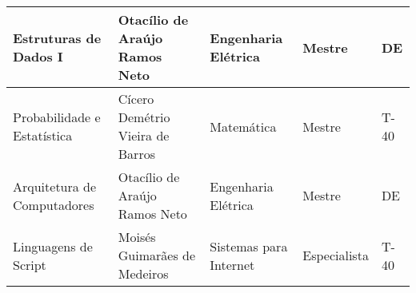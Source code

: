 \begin{table}[h!]
\begin{tabular}{lllll}
\multicolumn{1}{|l|}{\cellcolor[HTML]{FFFFFF}Estruturas de Dados I}                         & \multicolumn{1}{l|}{Otac\'ilio de Ara\'ujo Ramos Neto}   & \multicolumn{1}{l|}{Engenharia El\'etrica}             & \multicolumn{1}{l|}{Mestre}             & \multicolumn{1}{l|}{DE}                        \\ \hline
\multicolumn{1}{|l|}{Probabilidade e Estat\'istica}                                             & \multicolumn{1}{l|}{Cícero Demétrio Vieira de Barros}                 & \multicolumn{1}{l|}{Matem\'atica}  & \multicolumn{1}{l|}{Mestre}             & \multicolumn{1}{l|}{T-40}                          \\ \hline
\multicolumn{1}{|l|}{Arquitetura de Computadores}                                                      & \multicolumn{1}{l|}{Otac\'ilio de Ara\'ujo Ramos Neto} & \multicolumn{1}{l|}{Engenharia El\'etrica}  & \multicolumn{1}{l|}{Mestre}             & \multicolumn{1}{l|}{DE}                          \\ \hline
\multicolumn{1}{|l|}{Linguagens de Script}                                                         & \multicolumn{1}{l|}{Moisés Guimarães de Medeiros}       & \multicolumn{1}{l|}{Sistemas para Internet} & \multicolumn{1}{l|}{Especialista}       & \multicolumn{1}{l|}{T-40}                        \\ \hline
\end{tabular}
\end{table}

